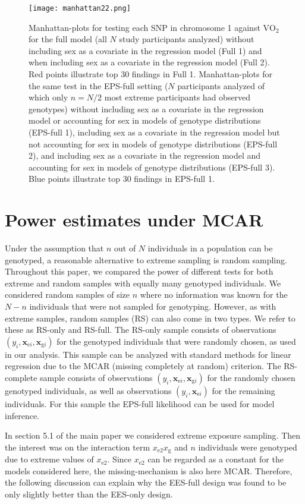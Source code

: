 \documentclass[10pt,a4paper]{article}
\def\bxgi{\mathbf{x}_{\text{g}i}}
\def\bxei{\mathbf{x}_{\text{e}i}}
\begin{document}
\begin{figure}[h]
	\centering
	\texttt{[image: manhattan22.png]}
	\caption{Manhattan-plots for testing each SNP in chromosome 1 against $\text{VO}_2$ for the full model (all $N$ study participants analyzed) without including sex as a covariate in the regression model (Full 1) and when including sex as a covariate in the regression model (Full 2). Red points illustrate top 30 findings in Full 1. Manhattan-plots for the same test in the EPS-full setting ($N$ participants analyzed of which only $n=N/2$ most extreme participants had observed genotypes) without including sex as a covariate in the regression model or accounting for sex in models of genotype distributions (EPS-full 1), including sex as a covariate in the regression model but not accounting for sex in models of genotype distributions (EPS-full 2), and including sex as a covariate in the regression model and accounting for sex in models of genotype distributions (EPS-full 3). Blue points illustrate top 30 findings in EPS-full 1.}
	\label{fig:manhattan2}
\end{figure}


\section{Power estimates under MCAR}
Under the assumption that $n$ out of $N$ individuals in a population can be genotyped, a reasonable alternative to extreme sampling is random sampling. Throughout this paper, we compared the power of different tests for both extreme and random samples with equally many genotyped individuals. We considered random samples of size $n$ where no information was known for the $N-n$ individuals that were not sampled for genotyping. However, as with extreme samples, random samples (RS) can also come in two types. We refer to these as RS-only and RS-full. The RS-only sample consists of observations $(y_i,\bxei,\bxgi)$ for the genotyped individuals that were randomly chosen, as used in our analysis. This sample can be analyzed with standard methods for linear regression due to the MCAR (missing completely at random) criterion. The RS-complete sample consists of observations $(y_i,\bxei,\bxgi)$ for the randomly chosen genotyped individuals, as well as observations $(y_i,\bxei)$ for the remaining individuals. For this sample the EPS-full likelihood can be used for model inference. 

In section 5.1 of the main paper we considered extreme exposure sampling. Then the interest was on the interaction term $x_{\text{e}2} x_{\text{g}}$ and $n$ individuals were genotyped due to extreme values of $x_{\text{e}2}$. Since $x_{\text{e}2}$ can be regarded as a constant for the models considered here, the missing-mechanism is also here MCAR. Therefore, the following discussion can explain why the EES-full design was found to be only slightly better than the EES-only design.
\end{document}
